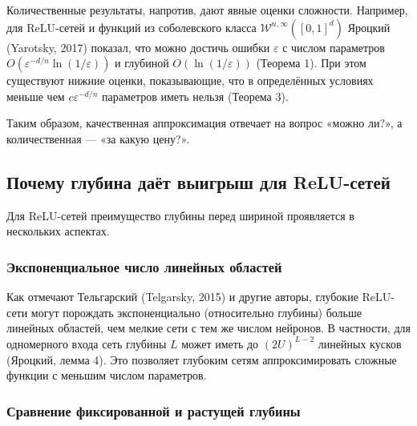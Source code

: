 \documentclass[12pt]{article}
\begin{document}
	Количественные результаты, напротив, дают явные оценки сложности. Например, для ReLU-сетей и функций из соболевского класса $\mathcal{W}^{n,\infty}([0,1]^d)$ Яроцкий (Yarotsky, 2017) показал, что можно достичь ошибки $\varepsilon$ с числом параметров $O(\varepsilon^{-d/n}\ln(1/\varepsilon))$ и глубиной $O(\ln(1/\varepsilon))$ (Теорема 1). При этом существуют нижние оценки, показывающие, что в определённых условиях меньше чем $c\varepsilon^{-d/n}$ параметров иметь нельзя (Теорема 3).
	
	Таким образом, качественная аппроксимация отвечает на вопрос «можно ли?», а количественная — «за какую цену?».
	
	\subsection{Почему глубина даёт выигрыш для ReLU-сетей}
	
	Для ReLU-сетей преимущество глубины перед шириной проявляется в нескольких аспектах.
	
	\subsubsection*{Экспоненциальное число линейных областей}
	
	Как отмечают Тельгарский (Telgarsky, 2015) и другие авторы, глубокие ReLU-сети могут порождать экспоненциально (относительно глубины) больше линейных областей, чем мелкие сети с тем же числом нейронов. В частности, для одномерного входа сеть глубины $L$ может иметь до $(2U)^{L-2}$ линейных кусков (Яроцкий, лемма 4). Это позволяет глубоким сетям аппроксимировать сложные функции с меньшим числом параметров.
	
	\subsubsection*{Сравнение фиксированной и растущей глубины}
	
\end{document}

